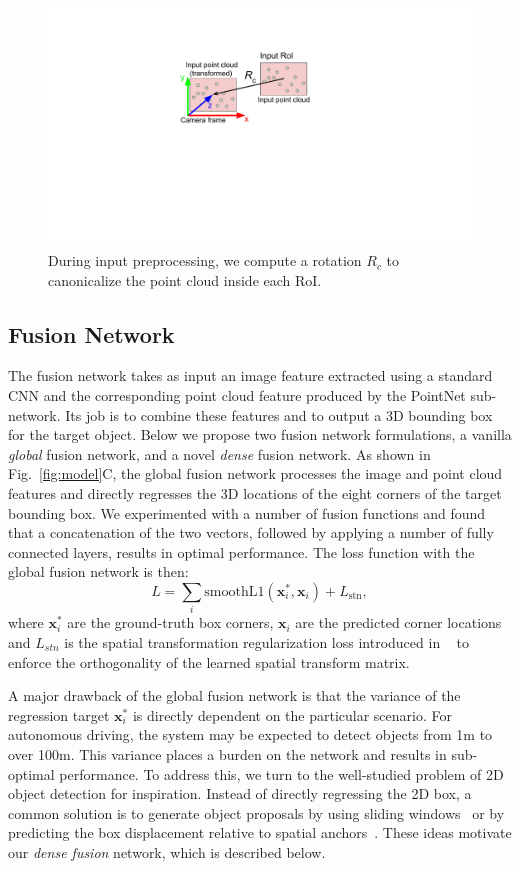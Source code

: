 \documentclass[10pt,twocolumn,letterpaper]{article}
\begin{document}
\begin{figure}[!t]
\centering
\includegraphics[width=0.6\linewidth]{transform.pdf}
\caption{During input preprocessing, we compute a rotation $R_c$ to canonicalize the point cloud inside each RoI.}
\label{fig:transform}
\end{figure}


\subsection{Fusion Network}
The fusion network takes as input an image feature extracted using a standard CNN and the corresponding point cloud feature produced by the PointNet sub-network. Its job is to combine these features and to output a 3D bounding box for the target object. Below we propose two fusion network formulations, a vanilla \textit{global} fusion network, and a novel \textit{dense} fusion network.
 As shown in Fig.~\ref{fig:model}C, the global fusion network processes the image and point cloud features and directly regresses the 3D locations of the eight corners of the target bounding box. We experimented with a number of fusion functions and found that a  concatenation of the two vectors, followed by applying a number of fully connected layers, results in optimal performance. The loss function with the global fusion network is then:
\begin{equation}
    L = \sum_i \mathrm{smoothL1}(\mathbf{x}^*_i, \mathbf{x}_i) + L_{\mathrm{stn}},
\end{equation}
where $\mathbf{x}^*_i$ are the ground-truth box corners, $\mathbf{x}_i$ are the predicted corner locations and $L_{stn}$ is the spatial transformation regularization loss introduced in ~\cite{qi2016pointnet} to enforce the orthogonality of the learned spatial transform matrix. 

A major drawback of the global fusion network is that the variance of the regression target $\mathbf{x}^*_i$ is directly dependent on the particular scenario. For autonomous driving, the system may be expected to detect objects from 1m to over 100m. This variance places a burden on the network and results in sub-optimal performance. To address this, we turn to the well-studied problem of 2D object detection for inspiration. Instead of directly regressing the 2D box, a common solution is to generate object proposals by using sliding windows~\cite{dalal2005histograms} or by predicting the box displacement relative to spatial anchors~\cite{redmon2016you,erhan2014scalable,huang2015densebox,ren2015faster}. These ideas motivate our \textit{dense fusion} network, which is described below.
\end{document}
